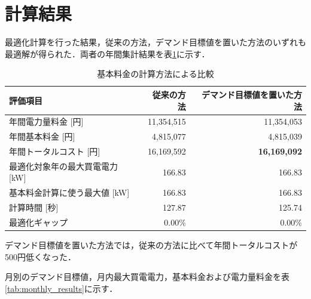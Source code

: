 \documentclass[a4paper,11pt,dvipdfmx]{jsarticle}
\begin{document}
\section{計算結果}
最適化計算を行った結果，従来の方法，デマンド目標値を置いた方法のいずれも最適解が得られた．両者の年間集計結果を表\ref{tab:comparison_results}に示す．

\begin{table}[H]
    \centering
    \caption{基本料金の計算方法による比較}
    \label{tab:comparison_results}
    \begin{tabular}{lrr}
        \toprule
        評価項目               & 従来の方法      & デマンド目標値を置いた方法       \\
        \midrule
        年間電力量料金 [円]        & 11,354,515 & 11,354,053          \\
        年間基本料金 [円]         & 4,815,077  & 4,815,039           \\
        年間トータルコスト [円]      & 16,169,592 & \textbf{16,169,092} \\
        最適化対象年の最大買電電力 [kW] & 166.83     & 166.83              \\
        基本料金計算に使う最大値 [kW]  & 166.83     & 166.83              \\
        計算時間 [秒]           & 127.87     & 125.74              \\
        最適化ギャップ            & 0.00\%     & 0.00\%              \\
        \bottomrule
    \end{tabular}
\end{table}

デマンド目標値を置いた方法では，従来の方法に比べて年間トータルコストが500円低くなった．

月別のデマンド目標値，月内最大買電電力，基本料金および電力量料金を表\ref{tab:monthly_results}に示す．
\end{document}
